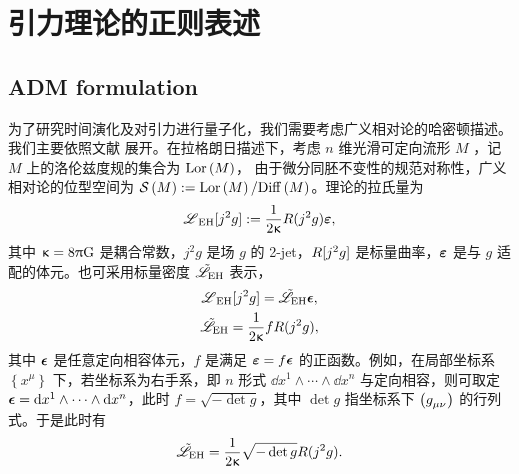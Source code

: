 
\chapter{引力理论的正则表述}

	\label{chp-canonical_gravity}\label{CHP-CANONICAL_GRAVITY}
	\section{ADM formulation}
	
		\label{sec_adm}
		为了研究时间演化及对引力进行量子化，我们需要考虑广义相对论的哈密顿描述。我们主要依照文献  展开。在拉格朗日描述下，考虑 $n$ 维光滑可定向流形 $M$ ，记$M$ 上的洛伦兹度规的集合为 $\mathrm{Lor}\left(M\right)$， 由于微分同胚不变性的规范对称性，广义相对论的位型空间为 $\mathcal{S}\left(M\right) := \mathrm{Lor}\left(M\right)/\mathrm{Diff}\left(M\right)$。理论的拉氏量为
		\begin{equation}
			\bm{\mathscr{L}}_{\text{EH}}[j^2 g] := \frac{1}{2\upkappa} {R}(j^2 g) \bm{\varepsilon},
		\end{equation}
		其中 $\gkappa = 8\uppi \nG$ 是耦合常数，$j^2 g$ 是场 $g$ 的 2-jet，${R}[j^2 g]$ 是标量曲率，$\bm{\varepsilon}$ 是与 $g$ 适配的体元。也可采用标量密度 $\tilde{\mathscr{L}}_{\text{EH}}$ 表示，
		\begin{gather}
			\bm{\mathscr{L}}_{\text{EH}}[j^2 g] = \tilde{\mathscr{L}}_{\text{EH}} \bm{\epsilon},\\
			\tilde{\mathscr{L}}_{\text{EH}} = \frac{1}{2\upkappa} f {R}(j^2 g),
		\end{gather}
		其中 $\bm{\epsilon}$ 是任意定向相容体元，$f$ 是满足 $\bm{\varepsilon} = f \bm{\epsilon}$ 的正函数。例如，在局部坐标系 $\left\{ x^\mu \right\}$ 下，若坐标系为右手系，即 $n$ 形式 $\dd{x^1} \wedge \cdots \wedge \dd{x^n}$ 与定向相容，则可取定 $\bm{\epsilon} = \dd{x^1} \wedge \cdots \wedge \dd{x^n}$，此时 $f=\sqrt{-\det g}$，其中 $\det g$ 指坐标系下 $\left( \tensor{g}{_\mu_\nu} \right)$ 的行列式。于是此时有
		\begin{equation}
			\tilde{\mathscr{L}}_{\text{EH}} = \frac{1}{2\upkappa} \sqrt{-\det g} {R}(j^2 g).
		\end{equation}

		\nomenclature{$\gkappa$}{$\gkappa=8\uppi \nG$}

